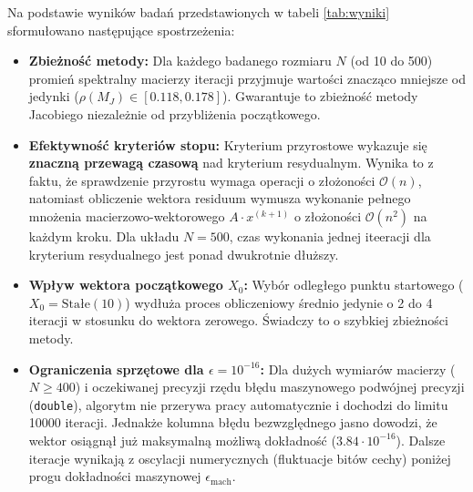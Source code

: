 \documentclass[twoside]{article}
\begin{document}
Na podstawie wyników badań przedstawionych w tabeli \ref{tab:wyniki} sformułowano następujące spostrzeżenia:
\begin{itemize}
    \item \textbf{Zbieżność metody:} Dla każdego badanego rozmiaru $N$ (od 10 do 500) promień spektralny macierzy iteracji przyjmuje wartości znacząco mniejsze
    od jedynki ($\rho(M_J) \in [0.118, 0.178]$). Gwarantuje to zbieżność metody Jacobiego niezależnie od przybliżenia początkowego.
    
    \item \textbf{Efektywność kryteriów stopu:} Kryterium przyrostowe wykazuje się \textbf{znaczną przewagą czasową} nad kryterium resydualnym. Wynika to z faktu,
    że sprawdzenie przyrostu wymaga operacji o złożoności $\mathcal{O}(n)$, natomiast obliczenie wektora residuum wymusza wykonanie pełnego
    mnożenia macierzowo-wektorowego $A \cdot x^{(k+1)}$ o złożoności $\mathcal{O}(n^2)$ na każdym kroku. Dla układu $N=500$, czas wykonania jednej iteeracji
    dla kryterium resydualnego jest ponad dwukrotnie dłuższy.
    
    \item \textbf{Wpływ wektora początkowego $X_0$:} Wybór odległego punktu startowego ($X_0 = \text{Stałe}(10)$) wydłuża proces obliczeniowy średnio jedynie
    o 2 do 4 iteracji w stosunku do wektora zerowego. Świadczy to o szybkiej zbieżności metody.
    
    \item \textbf{Ograniczenia sprzętowe dla $\epsilon = 10^{-16}$:} Dla dużych wymiarów macierzy ($N \ge 400$) i oczekiwanej precyzji rzędu błędu
    maszynowego podwójnej precyzji (\texttt{double}), algorytm nie przerywa pracy automatycznie i dochodzi do limitu 10000 iteracji.
    Jednakże kolumna błędu bezwzględnego jasno dowodzi, że wektor osiągnął już maksymalną możliwą dokładność ($3.84 \cdot 10^{-16}$).
    Dalsze iteracje wynikają z oscylacji numerycznych (fluktuacje bitów cechy) poniżej progu dokładności maszynowej $\epsilon_{\text{mach}}$.
\end{itemize}
\end{document}
